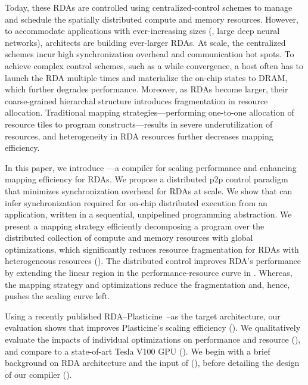 Today, these RDAs are controlled using centralized-control schemes to manage and schedule the spatially distributed compute and memory resources.
However, to accommodate applications with ever-increasing sizes (\eg, large deep neural networks), architects are building ever-larger RDAs.
At scale, the centralized schemes incur high synchronization overhead and communication hot spots. 
To achieve complex control schemes, such as a while convergence, a host often has to launch the RDA multiple times and materialize the on-chip states to DRAM, which further degrades performance.
Moreover, as RDAs become larger, their coarse-grained hierarchal structure introduces fragmentation in resource allocation.
Traditional mapping strategies---performing one-to-one allocation of resource tiles to program constructs---results in severe underutilization of resources, and heterogeneity in RDA resources further decreases mapping efficiency.

In this paper, we introduce \name{}---a compiler for scaling performance and enhancing mapping efficiency for RDAs. 
We propose a distributed p2p control paradigm that minimizes synchronization overhead for RDAs at scale.
We show that \name{} can infer synchronization required for on-chip distributed execution from an application, written in a sequential, unpipelined programming abstraction.
We present a mapping strategy efficiently decomposing a program over the distributed collection of compute and memory resources with global optimizations, which significantly reduces resource fragmentation for RDAs with heterogeneous resources ().
The distributed control improves RDA's performance by extending the linear region in the performance-resource curve in .
Whereas, the mapping strategy and optimizations reduce the fragmentation and, hence, pushes the scaling curve left.

Using a recently published RDA--Plasticine~\cite{plasticine}--as the target architecture, our evaluation shows that \name improves Plasticine's scaling efficiency ().
We qualitatively evaluate the impacts of individual optimizations on performance and resource (), and compare to a state-of-art Tesla V100 GPU ().
We begin with a brief background on RDA architecture and the input of \name{} (), before detailing the design of our compiler (). 
